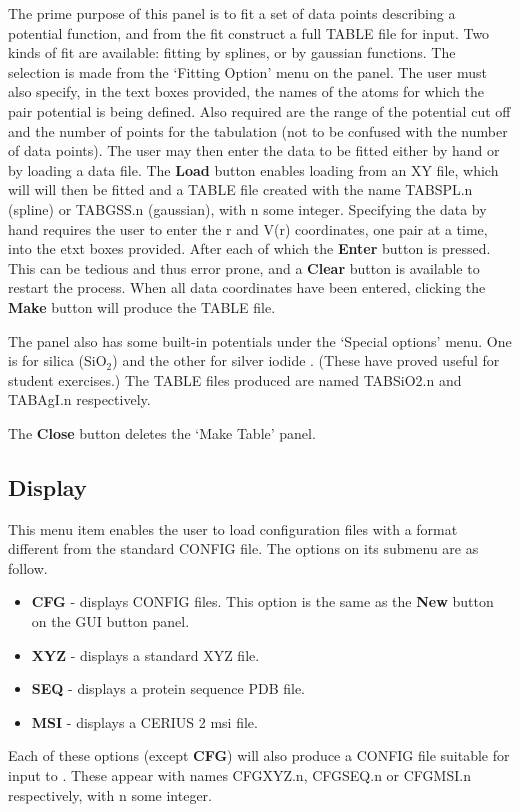 \begin{enumerate}
\noindent
The prime purpose of this panel is to fit a set of data points
describing a potential function, and from the fit construct a full
TABLE file for \DD{} input. Two kinds of fit are available: fitting by
splines, or by gaussian functions. The selection is made from the
`Fitting Option' menu on the panel. The user must also specify, in the
text boxes provided, the names of the atoms for which the pair
potential is being defined.  Also required are the range of the
potential cut off and the number of points for the tabulation (not to
be confused with the number of data points). The user may then enter
the data to be fitted either by hand or by loading a data file. The
{\bf Load} button enables loading from an XY file, which will will
then be fitted and a TABLE file created with the name TABSPL.n
(spline) or TABGSS.n (gaussian), with n some integer. Specifying the
data by hand requires the user to enter the r and V(r) coordinates,
one pair at a time, into the etxt boxes provided. After each of which
the {\bf Enter} button is pressed. This can be tedious and thus error
prone, and a {\bf Clear} button is available to restart the
process. When all data coordinates have been entered, clicking the
{\bf Make} button will produce the TABLE file.

The panel also has some built-in potentials under the `Special
options' menu. One is for silica (SiO$_2$) \cite{vessal-90a} and the
other for silver iodide \cite{vashishta-78a}. (These have proved
useful for student exercises.) The TABLE files produced are named
TABSiO2.n and TABAgI.n respectively.

The {\bf Close} button deletes the `Make Table' panel.

\end{enumerate}

\subsection{Display}

This menu item enables the user to load configuration files with a
format different from the standard \DD{} CONFIG file. The options on its
submenu are as follow.
\begin{itemize}
\item {\bf CFG} - displays \DD{} CONFIG files. This option is the same as
the {\bf New} button on the GUI button panel.
\item {\bf XYZ} - displays a standard XYZ file.
\item {\bf SEQ} - displays a protein sequence PDB file.
\item {\bf MSI} - displays a CERIUS 2 msi file.
\end{itemize}
Each of these options (except {\bf CFG}) will also produce a CONFIG
file suitable for input to \DD{}. These appear with names CFGXYZ.n,
CFGSEQ.n or CFGMSI.n respectively, with n some integer.

